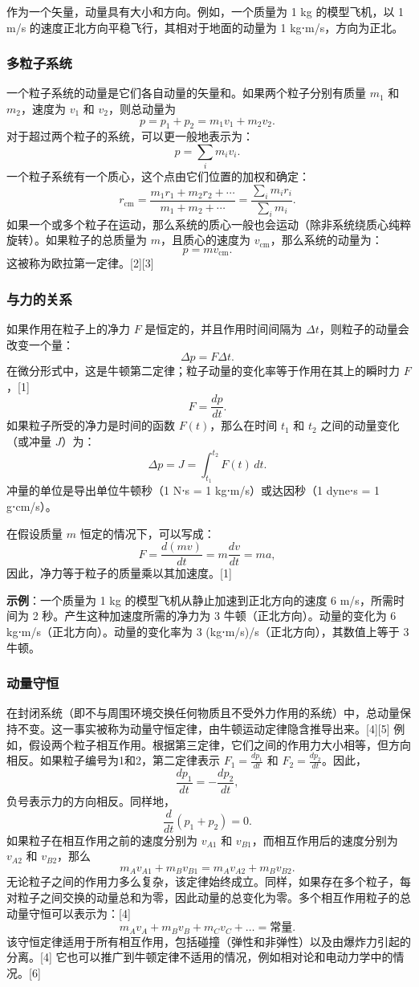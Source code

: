作为一个矢量，动量具有大小和方向。例如，一个质量为 1 kg 的模型飞机，以 1 m/s 的速度正北方向平稳飞行，其相对于地面的动量为 1 kg⋅m/s，方向为正北。
\subsubsection{多粒子系统}
一个粒子系统的动量是它们各自动量的矢量和。如果两个粒子分别有质量 \( m_1 \) 和 \( m_2 \)，速度为 \( v_1 \) 和 \( v_2 \)，则总动量为
\[
p = p_1 + p_2 = m_1 v_1 + m_2 v_2.~
\]
对于超过两个粒子的系统，可以更一般地表示为：
\[
p = \sum_i m_i v_i.~
\]
一个粒子系统有一个质心，这个点由它们位置的加权和确定：
\[
r_{\text{cm}} = \frac{m_1 r_1 + m_2 r_2 + \cdots}{m_1 + m_2 + \cdots} = \frac{\sum_i m_i r_i}{\sum_i m_i}.~
\]
如果一个或多个粒子在运动，那么系统的质心一般也会运动（除非系统绕质心纯粹旋转）。如果粒子的总质量为 \( m \)，且质心的速度为 \( v_{\text{cm}} \)，那么系统的动量为：
\[
p = m v_{\text{cm}}.~
\]
这被称为欧拉第一定律。[2][3]
\subsubsection{与力的关系}
如果作用在粒子上的净力 \( F \) 是恒定的，并且作用时间间隔为 \( \Delta t \)，则粒子的动量会改变一个量：
\[
\Delta p = F \Delta t.~
\]
在微分形式中，这是牛顿第二定律；粒子动量的变化率等于作用在其上的瞬时力 \( F \)，[1]
\[
F = \frac{d p}{d t}.~
\]
如果粒子所受的净力是时间的函数 \( F(t) \)，那么在时间 \( t_1 \) 和 \( t_2 \) 之间的动量变化（或冲量 \( J \)）为：
\[
\Delta p = J = \int_{t_1}^{t_2} F(t) \, dt.~
\]
冲量的单位是导出单位牛顿秒（1 N⋅s = 1 kg⋅m/s）或达因秒（1 dyne⋅s = 1 g⋅cm/s）。

在假设质量 \( m \) 恒定的情况下，可以写成：
\[
F = \frac{d(mv)}{dt} = m \frac{dv}{dt} = ma,~
\]
因此，净力等于粒子的质量乘以其加速度。[1]

\textbf{示例}：一个质量为 1 kg 的模型飞机从静止加速到正北方向的速度 6 m/s，所需时间为 2 秒。产生这种加速度所需的净力为 3 牛顿（正北方向）。动量的变化为 6 kg⋅m/s（正北方向）。动量的变化率为 3 (kg⋅m/s)/s（正北方向），其数值上等于 3 牛顿。
\subsubsection{动量守恒}
在封闭系统（即不与周围环境交换任何物质且不受外力作用的系统）中，总动量保持不变。这一事实被称为动量守恒定律，由牛顿运动定律隐含推导出来。[4][5] 例如，假设两个粒子相互作用。根据第三定律，它们之间的作用力大小相等，但方向相反。如果粒子编号为1和2，第二定律表示 \( F_1 = \frac{dp_1}{dt} \) 和 \( F_2 = \frac{dp_2}{dt} \)。因此，
\[
\frac{dp_1}{dt} = -\frac{dp_2}{dt},~
\]
负号表示力的方向相反。同样地，
\[
\frac{d}{dt}(p_1 + p_2) = 0.~
\]
如果粒子在相互作用之前的速度分别为 \( v_{A1} \) 和 \( v_{B1} \)，而相互作用后的速度分别为 \( v_{A2} \) 和 \( v_{B2} \)，那么
\[
m_{A}v_{A1} + m_{B}v_{B1} = m_{A}v_{A2} + m_{B}v_{B2}.~
\]
无论粒子之间的作用力多么复杂，该定律始终成立。同样，如果存在多个粒子，每对粒子之间交换的动量总和为零，因此动量的总变化为零。多个相互作用粒子的总动量守恒可以表示为：[4]
\[
m_{A}v_{A} + m_{B}v_{B} + m_{C}v_{C} + \dots = \text{常量}.~
\]
该守恒定律适用于所有相互作用，包括碰撞（弹性和非弹性）以及由爆炸力引起的分离。[4] 它也可以推广到牛顿定律不适用的情况，例如相对论和电动力学中的情况。[6]
